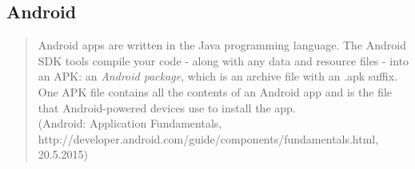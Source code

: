 \subsection{Android}\label{sec:app-android}
	\begin{quote}
	Android apps are written in the Java programming language. The Android SDK tools compile your code - along with any data and resource files - into an APK: an \textit{Android package}, which is an archive file with an .apk suffix. One APK file contains all the contents of an Android app and is the file that Android-powered devices use to install the app.\\
	(Android: Application Fundamentals,\\ http://developer.android.com/guide/components/fundamentals.html,\\ 20.5.2015)
	\end{quote}
	
